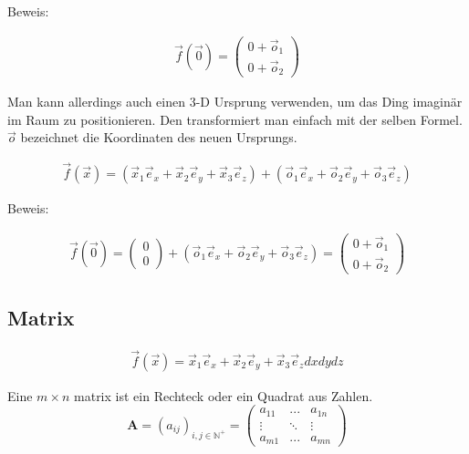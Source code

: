 \documentclass[a4paper]{article}
\begin{document}
Beweis:

\begin{displaymath}
\begin{align}
\vec{f}(\vec{0}) = \begin{pmatrix}0 + \vec{o}_1\\0 + \vec{o}_2\end{pmatrix}
\end{align}
\end{displaymath}

Man kann allerdings auch einen 3-D Ursprung verwenden, um das Ding imagin\"ar im Raum zu positionieren. Den transformiert man einfach
mit der selben Formel. $\vec{o}$ bezeichnet die Koordinaten des neuen Ursprungs.

\begin{displaymath}
\begin{align}
\vec{f}(\vec{x}) = (\vec{x}_{1}\vec{e}_{x}+\vec{x}_{2}\vec{e}_{y}+\vec{x}_{3}\vec{e}_{z}) + (\vec{o}_{1}\vec{e}_{x}+\vec{o}_{2}\vec{e}_{y}+\vec{o}_{3}\vec{e}_{z})
\end{align}
\end{displaymath}

Beweis:

\begin{displaymath}
\begin{align}  
\vec{f}(\vec{0}) = \begin{pmatrix}0\\0\end{pmatrix} + (\vec{o}_{1}\vec{e}_{x}+\vec{o}_{2}\vec{e}_{y}+\vec{o}_{3}\vec{e}_{z}) = \begin{pmatrix}0 + \vec{o}_1\\0 + \vec{o}_2\end{pmatrix}
\end{align}
\end{displaymath}



\subsection{Matrix}

\begin{displaymath}
\begin{align}
\vec{f}(\vec{x}) = \vec{x}_{1}\vec{e}_{x}+\vec{x}_{2}\vec{e}_{y}+\vec{x}_{3}\vec{e}_{z} dxdydz
\end{align}
\end{displaymath}\label{Matrix}

Eine $m\times n$ matrix ist ein Rechteck oder ein Quadrat aus Zahlen.\\
\begin{displaymath}
    \boldsymbol{A} = (a_{ij})_{i,j \in \mathbb{N}^{+}} = \begin{pmatrix}a_{11} & ... & a_{1n}\\\vdots&\ddots&\vdots\\a_{m1} & ... & a_{mn}\end{pmatrix}
\end{displaymath}\\
\end{document}
